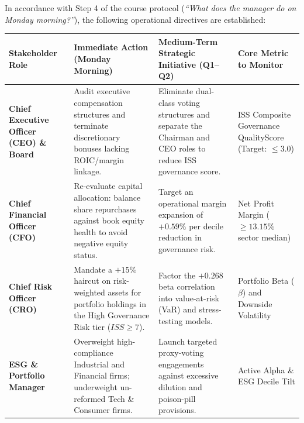 \documentclass[
]{article}
\newcounter{none} %
\begin{document}
In accordance with Step 4 of the course protocol (\emph{``What does the
manager do on Monday morning?''}), the following operational directives
are established:

{\def\LTcaptype{none} %
\begin{longtable}[]{@{}
  >{\raggedright\arraybackslash}p{}
  >{\raggedright\arraybackslash}p{}
  >{\raggedright\arraybackslash}p{}
  >{\raggedright\arraybackslash}p{}@{}}
\toprule\noalign{}
\begin{minipage}[b]{\linewidth}\raggedright
Stakeholder Role
\end{minipage} & \begin{minipage}[b]{\linewidth}\raggedright
Immediate Action (Monday Morning)
\end{minipage} & \begin{minipage}[b]{\linewidth}\raggedright
Medium-Term Strategic Initiative (Q1--Q2)
\end{minipage} & \begin{minipage}[b]{\linewidth}\raggedright
Core Metric to Monitor
\end{minipage} \\
\midrule\noalign{}
\endhead
\bottomrule\noalign{}
\endlastfoot
\textbf{Chief Executive Officer (CEO) \& Board} & Audit executive
compensation structures and terminate discretionary bonuses lacking
ROIC/margin linkage. & Eliminate dual-class voting structures and
separate the Chairman and CEO roles to reduce ISS governance score. &
ISS Composite Governance QualityScore (Target: \(\le 3.0\)) \\
\textbf{Chief Financial Officer (CFO)} & Re-evaluate capital allocation:
balance share repurchases against book equity health to avoid negative
equity status. & Target an operational margin expansion of \(+0.59\%\)
per decile reduction in governance risk. & Net Profit Margin
(\(\ge 13.15\%\) sector median) \\
\textbf{Chief Risk Officer (CRO)} & Mandate a \(+15\%\) haircut on
risk-weighted assets for portfolio holdings in the High Governance Risk
tier (\(ISS \ge 7\)). & Factor the \(+0.268\) beta correlation into
value-at-risk (VaR) and stress-testing models. & Portfolio Beta
(\(\beta\)) and Downside Volatility \\
\textbf{ESG \& Portfolio Manager} & Overweight high-compliance
Industrial and Financial firms; underweight un-reformed Tech \& Consumer
firms. & Launch targeted proxy-voting engagements against excessive
dilution and poison-pill provisions. & Active Alpha \& ESG Decile
Tilt \\
\end{longtable}
}
\end{document}
